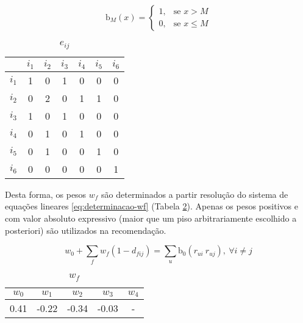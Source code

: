 \begin{equation}
\label{eq:b0}
\mathrm{b}_M\left(x\right) = 
\begin{cases}
1, &\text{se }x>M \\
0, &\text{se }x\leq M
\end{cases} 
\end{equation}

\begin{table}[p]
\begin{center}
    \caption{$e_{ij}$}
    \label{tab:eij}
    \begin{tabular}{ | c | c | c | c | c | c | c | } 
    \hline
     & $i_1$ & $i_2$ & $i_3$ & $i_4$ & $i_5$ & $i_6$  \\ \hline
     $i_1$ & 1 & 0 & 1 & 0 & 0 & 0 \\ \hline
     $i_2$ & 0 & 2 & 0 & 1 & 1 & 0  \\ \hline
     $i_3$ & 1 & 0 & 1 & 0 & 0 & 0 \\ \hline
     $i_4$ & 0 & 1 & 0 & 1 & 0 & 0 \\ \hline
     $i_5$ & 0 & 1 & 0 & 0 & 1 & 0 \\ \hline
     $i_6$ & 0 & 0 & 0 & 0 & 0 & 1 \\ \hline
    \end{tabular}
\end{center}
\end{table}

Desta forma, os pesos $w_f$ são determinados a partir resolução do sistema de equações lineares \ref{eq:determinacao-wf} (Tabela \ref{tab:w_f}). Apenas os pesos positivos e com valor absoluto expressivo (maior que um piso arbitrariamente escolhido a posteriori) são utilizados na recomendação. 

\begin{equation}
\label{eq:determinacao-wf} 
    w_0 + \sum_{f}{w_{f}  \left(1-d_{fij}\right)} = \sum_{u}{\mathrm{b_0}\left(r_{ui} ~ r_{uj}\right)},~\forall i \neq j 
\end{equation} 

\begin{table}[p]
\begin{center}
    \caption{$w_f$}
    \label{tab:w_f}
    \begin{tabular}{ | c | c | c | c | c | } 
    \hline
     $w_0$ & $w_1$ & $w_2$ & $w_3$ & $w_4$   \\ \hline
     0.41 & -0.22 & -0.34 & -0.03 & -   \\ \hline
    \end{tabular}
\end{center}
\end{table}

